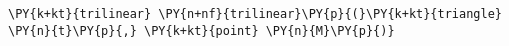 \begin{Verbatim}[commandchars=\\\{\}]
  \PY{k+kt}{trilinear} \PY{n+nf}{trilinear}\PY{p}{(}\PY{k+kt}{triangle} \PY{n}{t}\PY{p}{,} \PY{k+kt}{point} \PY{n}{M}\PY{p}{)}
\end{Verbatim}
